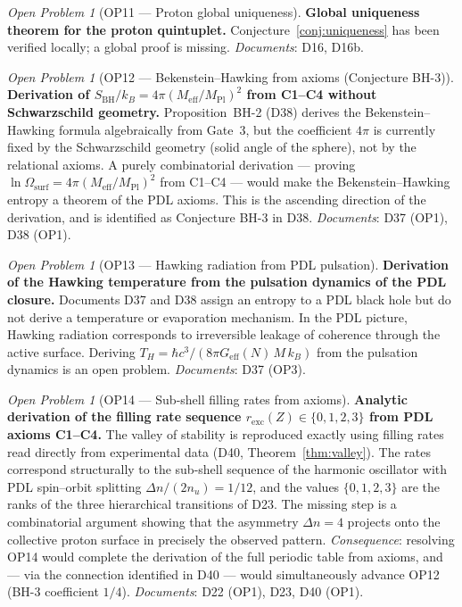 \documentclass[11pt,a4paper]{article}
\theoremstyle{plain}
\theoremstyle{definition}
\theoremstyle{remark}
\newtheorem{openproblem}[theorem]{Open Problem}
\newcommand{\Geff}{G_{\mathrm{eff}}}
\newcommand{\SBH}{S_{\mathrm{BH}}}
\newcommand{\Meff}{M_{\mathrm{eff}}}
\newcommand{\MPl}{M_{\mathrm{Pl}}}
\begin{document}
\begin{openproblem}[OP11 — Proton global uniqueness]
\label{op:uniqueness}
\textbf{Global uniqueness theorem for the proton quintuplet.}
Conjecture~\ref{conj:uniqueness} has been verified locally; a global proof is missing.
\emph{Documents}: D16, D16b.
\end{openproblem}

\begin{openproblem}[OP12 — Bekenstein--Hawking from axioms (Conjecture BH-3)]
\label{op:BH3}
\textbf{Derivation of $\SBH/k_B = 4\pi(\Meff/\MPl)^2$ from C1--C4 without Schwarzschild geometry.}
Proposition~BH-2 (D38) derives the Bekenstein--Hawking formula algebraically from Gate~3, but the coefficient $4\pi$ is currently fixed by the Schwarzschild geometry (solid angle of the sphere), not by the relational axioms.
A purely combinatorial derivation — proving $\ln\Omega_{\mathrm{surf}} = 4\pi(\Meff/\MPl)^2$ from C1--C4 — would make the Bekenstein--Hawking entropy a theorem of the PDL axioms.
This is the ascending direction of the derivation, and is identified as Conjecture BH-3 in D38.
\emph{Documents}: D37 (OP1), D38 (OP1).
\end{openproblem}

\begin{openproblem}[OP13 — Hawking radiation from PDL pulsation]
\label{op:hawking}
\textbf{Derivation of the Hawking temperature from the pulsation dynamics of the PDL closure.}
Documents D37 and D38 assign an entropy to a PDL black hole but do not derive a temperature or evaporation mechanism.
In the PDL picture, Hawking radiation corresponds to irreversible leakage of coherence through the active surface.
Deriving $T_H = \hbar c^3/(8\pi\Geff(N)\,M\,k_B)$ from the pulsation dynamics is an open problem.
\emph{Documents}: D37 (OP3).
\end{openproblem}

\begin{openproblem}[OP14 — Sub-shell filling rates from axioms]
\label{op:filling}
\textbf{Analytic derivation of the filling rate sequence $r_{\mathrm{exc}}(Z) \in \{0,1,2,3\}$ from PDL axioms C1--C4.}
The valley of stability is reproduced exactly using filling rates read directly from experimental data (D40, Theorem~\ref{thm:valley}).
The rates correspond structurally to the sub-shell sequence of the harmonic oscillator with PDL spin--orbit splitting $\Delta n/(2n_u) = 1/12$, and the values $\{0,1,2,3\}$ are the ranks of the three hierarchical transitions of D23.
The missing step is a combinatorial argument showing that the asymmetry $\Delta n = 4$ projects onto the collective proton surface in precisely the observed pattern.
\emph{Consequence}: resolving OP14 would complete the derivation of the full periodic table from axioms, and — via the connection identified in D40 — would simultaneously advance OP12 (BH-3 coefficient $1/4$).
\emph{Documents}: D22 (OP1), D23, D40 (OP1).
\end{openproblem}
\end{document}
